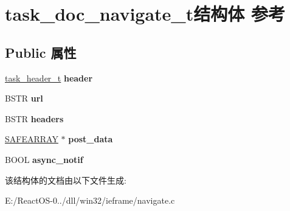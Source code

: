 \hypertarget{structtask__doc__navigate__t}{}\section{task\+\_\+doc\+\_\+navigate\+\_\+t结构体 参考}
\label{structtask__doc__navigate__t}
\subsection*{Public 属性}
\begin{DoxyCompactItemize}
\item 
\mbox{\label{structtask__doc__navigate__t_a2f6a811cd0d24baa8aa561e6add39aa7}} 
\hyperlink{structtask__header__t}{task\+\_\+header\+\_\+t} {\bfseries header}
\item 
\mbox{\label{structtask__doc__navigate__t_a4a7adaf57d8f04a56551f2a4126726b3}} 
B\+S\+TR {\bfseries url}
\item 
\mbox{\label{structtask__doc__navigate__t_a43e02531912eb03fa18f9e9c95dabede}} 
B\+S\+TR {\bfseries headers}
\item 
\mbox{\label{structtask__doc__navigate__t_a4728be7662015add1ad8757bb06c8ab7}} 
\hyperlink{structtag_s_a_f_e_a_r_r_a_y}{S\+A\+F\+E\+A\+R\+R\+AY} $\ast$ {\bfseries post\+\_\+data}
\item 
\mbox{\label{structtask__doc__navigate__t_a6fe1f859c18c8e823bce9a95d7a6ab42}} 
B\+O\+OL {\bfseries async\+\_\+notif}
\end{DoxyCompactItemize}


该结构体的文档由以下文件生成\+:\begin{DoxyCompactItemize}
\item 
E\+:/\+React\+O\+S-\/0../dll/win32/ieframe/navigate.\+c\end{DoxyCompactItemize}
